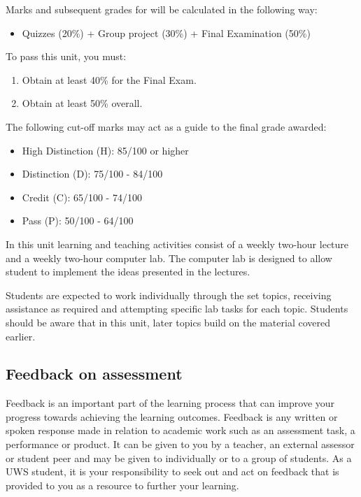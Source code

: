 \documentclass{uws_learning_guide}
\begin{document}
Marks and subsequent grades for \printunitnumber{} \printunitname{} will be
calculated in the following way:
\begin{itemize}
\item
  Quizzes (20\%) + Group project (30\%) + Final Examination (50\%)
\end{itemize}

To pass this unit, you must:
\begin{enumerate}
\item Obtain at least 40\% for the Final Exam.
\item Obtain at least 50\% overall.
\end{enumerate}

The following cut-off marks may act as a guide to the final grade awarded:
\begin{itemize}
\item High Distinction (H):            85/100 or higher
\item Distinction (D):                 75/100 - 84/100
\item Credit (C):                      65/100 - 74/100
\item Pass (P):                        50/100 - 64/100
\end{itemize}
In this unit learning and teaching activities consist of a weekly
two-hour lecture and a weekly two-hour computer lab. The computer lab
is designed to allow student to implement the ideas presented in the
lectures.


Students are expected to work individually through the set topics,
receiving assistance as required and attempting specific lab
tasks for each topic. Students should be aware that in this unit,
later topics build on the material covered earlier.



\subsection{\hintlogo{}  Feedback on assessment}

Feedback is an important part of the learning process that can improve
your progress towards achieving the learning outcomes.  Feedback is
any written or spoken response made in relation to academic work such
as an assessment task, a performance or product.  It can be given to
you by a teacher, an external assessor or student peer and may be
given to individually or to a group of students.  As a UWS student, it
is your responsibility to seek out and act on feedback that is
provided to you as a resource to further your learning.
\end{document}

